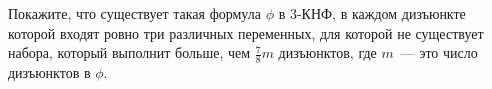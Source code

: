 Покажите, что существует такая формула $\phi$ в $3$-КНФ, в каждом дизъюнкте которой входят ровно три различных переменных,
для которой не существует набора, который выполнит больше, чем $\frac{7}{8} m$ дизъюнктов, где $m$~--- это число дизъюнктов в
$\phi$.